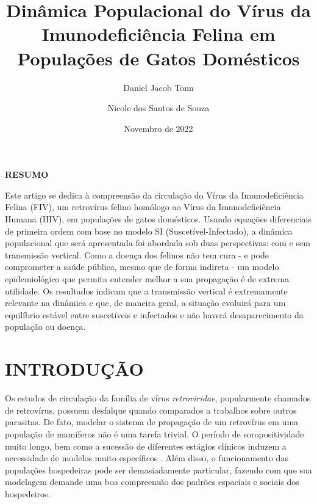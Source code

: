 \documentclass{article}
\title{Dinâmica Populacional do Vírus da Imunodeficiência Felina em
Populações de Gatos Domésticos}
\author[1]{Daniel Jacob Tonn}
\author[1]{Nicole dos Santos de Souza}
\affil[1]{Escola de Matemática Aplicada - FGV EMAp, Rio de Janeiro, RJ}
\date{Novembro de 2022}
\begin{document}
\maketitle
\begin{center}
    \textbf{RESUMO}
\end{center}


\noindent Este artigo se dedica à compreensão da circulação do Vírus da Imunodeficiência Felina (FIV), um
retrovírus felino homólogo ao Vírus da Imunodeficiência Humana (HIV), em populações de gatos domésticos. Usando equações diferenciais de primeira ordem com base no modelo SI (Suscetível-Infectado), a dinâmica populacional que será apresentada foi abordada sob duas perspectivas: com e sem transmissão vertical. Como a doença dos felinos não tem cura - e pode comprometer a saúde pública, mesmo que de forma indireta - um modelo epidemiológico que permita entender melhor a sua propagação é de extrema utilidade. Os resultados indicam que a transmissão vertical é extremamente relevante na dinâmica e que, de maneira geral, a situação evoluirá para um equilíbrio estável entre suscetíveis e infectados e não haverá desaparecimento da população ou doença.
\\

\noindent
{}

\newpage
\printglossary[title ={Lista de Abreviaturas e siglas}]
\newpage

\tableofcontents

\newpage
\section*{INTRODUÇÃO}
Os estudos de circulação da família de vírus  \textit{retroviridae}, popularmente chamados de retrovírus, possuem desfalque quando comparados a trabalhos sobre outros parasitas. De fato, modelar o sistema de propagação de um retrovírus em uma população de mamíferos não é uma tarefa trivial. O período de soropositividade muito longo, bem como a sucessão de diferentes estágios clínicos induzem a necessidade de modelos muito específicos \cite{base}. Além disso, o funcionamento das populações hospedeiras pode ser demasiadamente particular, fazendo com que sua modelagem demande uma boa compreensão dos padrões espaciais e sociais dos hospedeiros.\\
\end{document}
